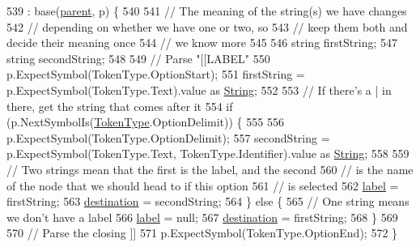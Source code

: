 \begin{DoxyCode}
539                                                                  : base(\hyperlink{a00120_af313a82103fcc2ff5a177dbb06b92f7b}{parent}, p) \{
540 
541                 \textcolor{comment}{// The meaning of the string(s) we have changes}
542                 \textcolor{comment}{// depending on whether we have one or two, so}
543                 \textcolor{comment}{// keep them both and decide their meaning once}
544                 \textcolor{comment}{// we know more}
545 
546                 \textcolor{keywordtype}{string} firstString;
547                 \textcolor{keywordtype}{string} secondString;
548 
549                 \textcolor{comment}{// Parse "[[LABEL"}
550                 p.ExpectSymbol(TokenType.OptionStart);
551                 firstString = p.ExpectSymbol(TokenType.Text).value as \hyperlink{a00029_a301aa7c866593a5b625a8fc158bbeacea27118326006d3829667a400ad23d5d98}{String};
552 
553                 \textcolor{comment}{// If there's a | in there, get the string that comes after it}
554                 \textcolor{keywordflow}{if} (p.NextSymbolIs(\hyperlink{a00029_a301aa7c866593a5b625a8fc158bbeace}{TokenType}.OptionDelimit)) \{
555 
556                     p.ExpectSymbol(TokenType.OptionDelimit);
557                     secondString = p.ExpectSymbol(TokenType.Text, TokenType.Identifier).value as 
      \hyperlink{a00029_a301aa7c866593a5b625a8fc158bbeacea27118326006d3829667a400ad23d5d98}{String};
558 
559                     \textcolor{comment}{// Two strings mean that the first is the label, and the second}
560                     \textcolor{comment}{// is the name of the node that we should head to if this option}
561                     \textcolor{comment}{// is selected}
562                     \hyperlink{a00118_a7f27d78e67fed6992767e995e70fc468}{label} = firstString;
563                     \hyperlink{a00118_abbe56fba06169901508e6c659f06c236}{destination} = secondString;
564                 \} \textcolor{keywordflow}{else} \{
565                     \textcolor{comment}{// One string means we don't have a label}
566                     \hyperlink{a00118_a7f27d78e67fed6992767e995e70fc468}{label} = null;
567                     \hyperlink{a00118_abbe56fba06169901508e6c659f06c236}{destination} = firstString;
568                 \}
569 
570                 \textcolor{comment}{// Parse the closing ]]}
571                 p.ExpectSymbol(TokenType.OptionEnd);
572             \}
\end{DoxyCode}


